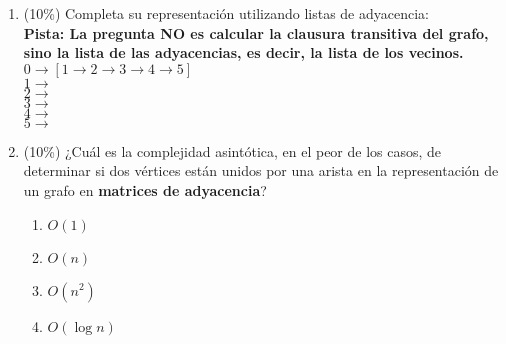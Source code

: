 \documentclass[10 pt]{article}
\begin{document}
\begin{multicols}{2}
\begin{center}
\end{center}

\begin{enumerate}[label=\alph*]
\item (10\%) Completa su representación utilizando listas de adyacencia:
\\
\textbf{Pista: La pregunta NO es calcular la clausura transitiva del grafo, sino la
lista de las adyacencias, es decir, la lista de los vecinos.}
\\
$0 \rightarrow [1 \rightarrow 2 \rightarrow 3 \rightarrow 4 \rightarrow 5]$
\\
$1 \rightarrow$
\\
$2 \rightarrow$
\\
$3 \rightarrow$
\\
$4 \rightarrow$
\\
$5 \rightarrow$
\item (10\%) ¿Cuál es la complejidad asintótica, en el peor de los casos, de determinar si dos vértices están unidos por una arista en la representación de un grafo en \textbf{matrices de adyacencia}?
\begin{enumerate}[label=(\roman*)]
\item $O(1)$
\item $O(n)$
\item $O(n^2)$
\item $O(\log n)$
\end{enumerate}
\end{enumerate}
\end{multicols}
\end{document}
